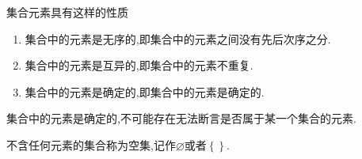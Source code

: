 \begin{formal}
\begin{theorem}[集合中元素的性质]\label{thm:集合中元素的性质}
    集合元素具有这样的性质\begin{enumerate}[label={\textup{(\arabic*)}}]
        \item 集合中的元素是无序的,即集合中的元素之间没有先后次序之分.
        \item 集合中的元素是互异的,即集合中的元素不重复.
        \item 集合中的元素是确定的,即集合中的元素是确定的.
    \end{enumerate}
\end{theorem}
\end{formal}
\begin{red}
\begin{remark}
    集合中的元素是确定的,不可能存在无法断言是否属于某一个集合的元素.
\end{remark}
\end{red}
\begin{formal}
\begin{definition}[空集的定义]\label{def:空集的定义}
    不含任何元素的集合称为空集,记作$\varnothing$或者$\left\{\right\}$.
\end{definition}
\end{formal}
